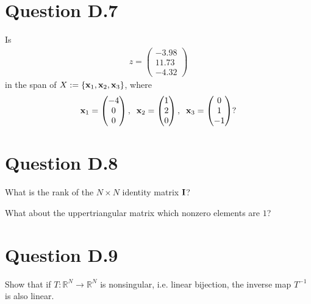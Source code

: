 \documentclass[letterpaper,10pt,english]{jupyterBook}
\begin{document}
\section{Question D.7}
\label{\detokenize{05.exercises.D:question-d-7}}
\sphinxAtStartPar
Is
\begin{equation*}
\begin{split}
z=
\begin{pmatrix}
-3.98 \\
11.73 \\
-4.32
\end{pmatrix}
\end{split}
\end{equation*}
\sphinxAtStartPar
in the span of \(X:=\{{\bf x}_1, {\bf x}_2, {\bf x}_3\}\), where
\begin{equation*}
\begin{split}
{\bf x}_1=
\begin{pmatrix}
-4 \\
0 \\
0
\end{pmatrix},
\;\;
{\bf x}_2=
\begin{pmatrix}
1 \\
2 \\
0
\end{pmatrix},
\;\;
{\bf x}_3=
\begin{pmatrix}
0 \\
1 \\
-1
\end{pmatrix}?
\end{split}
\end{equation*}

\section{Question D.8}
\label{\detokenize{05.exercises.D:question-d-8}}
\sphinxAtStartPar
What is the rank of the \(N \times N\) identity matrix \({\bf I}\)?

\sphinxAtStartPar
What about the upper\sphinxhyphen{}triangular matrix which non\sphinxhyphen{}zero elements are \(1\)?


\section{Question D.9}
\label{\detokenize{05.exercises.D:question-d-9}}
\sphinxAtStartPar
Show that if \(T: \mathbb{R}^N \to \mathbb{R}^N\) is nonsingular, i.e. linear bijection, the inverse map \(T^{-1}\) is also linear.
\end{document}
